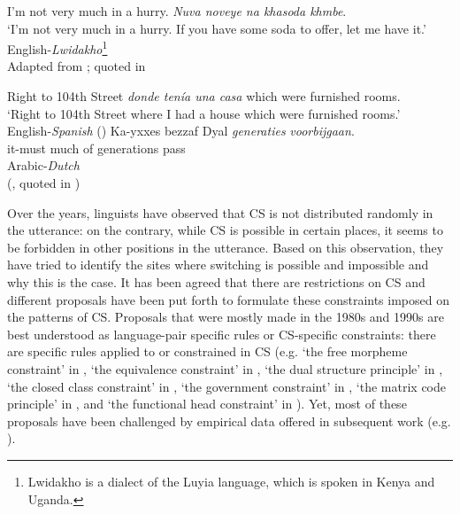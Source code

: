 \begin{exe} %
\ex\label{ex:1} I’m not very much in a hurry. \textit{Nuva noveye na khasoda khmbe}.	 \\
`I'm not very much in a hurry. If you have some soda to offer, let me have it.'   \hspace*{\fill} English-\textit{Lwidakho}\footnote{Lwidakho is a dialect of the Luyia language, which is spoken in Kenya and Uganda.} \\
  \hspace*{\fill} Adapted from \citet{Scotton1982}; quoted in \citet[]{MyersScotton2007} \\

\ex\label{ex:2} 
\begin{xlist} 
    \ex Right to 104th Street \textit{donde tenía una casa} which were furnished rooms. \\	
	‘Right to 104th Street where I had a house which were furnished rooms.’ \\
	  \hspace*{\fill}  English-\textit{Spanish} (\citealt[35]{SankoffPoplack})
    \ex 
    \gll Ka-yxxes bezzaf Dyal \textit{generaties} \textit{voorbijgaan}. \\
    it-must much of     generations pass \\
    \hspace*{\fill}  Arabic-\textit{Dutch} \\ \hspace*{\fill} (\citealt[139]{Nortier1990}, quoted in \citealt{Muysken1995})
\end{xlist} 
\end{exe} 

\newpage
Over the years, linguists have observed that \ac{CS} is not distributed randomly in the utterance: on the contrary, while \ac{CS} is possible in certain places, it seems to be forbidden in other positions in the utterance. Based on this observation, they have tried to identify the sites where switching is possible and impossible and why this is the case. It has been agreed that there are restrictions on \ac{CS} and different proposals have been put forth to formulate these constraints imposed on the patterns of \ac{CS}. Proposals that were mostly made in the 1980s and 1990s are best understood as language-pair specific rules or \ac{CS}-specific constraints: there are specific rules applied to or constrained in \ac{CS} (e.g. ‘the free morpheme constraint’ in \citealt{Poplack1980}, ‘the equivalence constraint’ in \citealt{Poplack1980,SankoffPoplack}, ‘the dual structure principle’ in \citealt{SridharSridhar1980}, ‘the closed class constraint' in \citealt{Joshi1985}, ‘the government constraint’ in \citealt{DiSciulloetal1986}, ‘the matrix code principle’ in \citealt{Kamwangamalu1989}, and ‘the functional head constraint’ in \citealt{Belazietal1994}). Yet, most of these proposals have been challenged by empirical data offered in subsequent work (e.g. \citealt{Lietal2018}).

